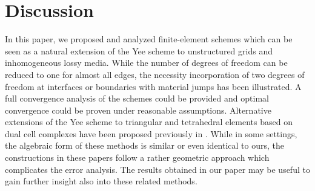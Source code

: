 \documentclass[12pt,reqno,a4paper]{amsart}
\theoremstyle{definition}
\begin{document}
\section{Discussion}\label{sec:discussion}

In this paper, we proposed and analyzed finite-element schemes which can be seen as a natural extension of the Yee scheme to unstructured grids and inhomogeneous lossy media.
While the number of degrees of freedom can be reduced to one for almost all edges, the necessity incorporation of two degrees of freedom at interfaces or boundaries with material jumps has been illustrated. 
A full convergence analysis of the schemes could be provided and optimal convergence could be proven under reasonable assumptions.
Alternative extensions of the Yee scheme to triangular and tetrahedral elements based on dual cell complexes have been proposed previously in \cite{CodecasaKapidaniSpecognaTrevisan18,CodecasaPoliti08,KapidaniCodecasaSchoberl21}.
While in some settings, the algebraic form of these methods is similar or even identical to ours, the constructions in these papers follow a rather geometric approach which complicates the error analysis. 
The results obtained in our paper may be useful to gain further insight also into these related methods. 
\end{document}
